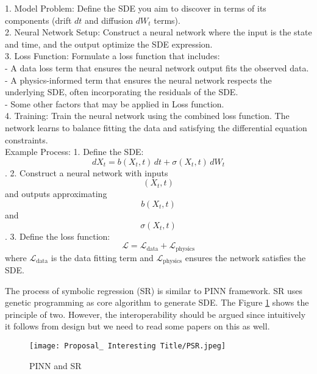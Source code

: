 \documentclass[12pt]{article}
\begin{document}
1. Model Problem: Define the SDE you aim to discover in terms of its components (drift $dt$ and diffusion $dW_t$ terms).\\
2. Neural Network Setup: Construct a neural network where the input is the state and time, and the output optimize the SDE expression.\\
3. Loss Function: Formulate a loss function that includes:\\
   - A data loss term that ensures the neural network output fits the observed data.\\
   - A physics-informed term that ensures the neural network respects the underlying SDE, often incorporating the residuals of the SDE.\\
   - Some other factors that may be applied in Loss function.\\
4. Training: Train the neural network using the combined loss function. The network learns to balance fitting the data and satisfying the differential equation constraints.\\

Example Process:
1. Define the SDE: \[dX_t = b(X_t, t) \, dt + \sigma(X_t, t) \, dW_t\].
2. Construct a neural network with inputs \[(X_t, t)\] and outputs approximating \[b(X_t, t)\] and \[\sigma(X_t, t)\].
3. Define the loss function:
   \[
   \mathcal{L} = \mathcal{L}_{\text{data}} +  \mathcal{L}_{\text{physics}}
   \]
   where \(\mathcal{L}_{\text{data}}\) is the data fitting term and \(\mathcal{L}_{\text{physics}}\) ensures the network satisfies the SDE.

The process of symbolic regression (SR) is similar to PINN framework. SR uses genetic programming as core algorithm to generate SDE. The Figure \ref{fig:PSR} shows the principle of two. However, the interoperability should be argued since intuitively it follows from design but we need to read some papers on this as well. 

\begin{figure}
    \centering
    \texttt{[image: Proposal\_ Interesting Title/PSR.jpeg]}
    \caption{PINN and SR}
    \label{fig:PSR}
\end{figure}
\end{document}
